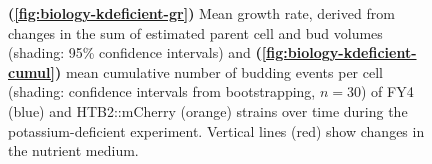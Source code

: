 \begin{figure}
  \caption[
    Mean growth rate, derived from changes in the sum of estimated parent cell and bud volumes and
    mean cumulative number of budding events per cell
    of FY4 and HTB2::mCherry strains over time during the potassium-deficient experiment.
  ]{
    \textbf{(\ref{fig:biology-kdeficient-gr})}
    Mean growth rate, derived from changes in the sum of estimated parent cell and bud volumes (shading: 95\% confidence intervals) and
    \textbf{(\ref{fig:biology-kdeficient-cumul})}
    mean cumulative number of budding events per cell (shading: confidence intervals from bootstrapping, $n=30$)
    of FY4 (blue) and HTB2::mCherry (orange) strains over time during the potassium-deficient experiment.
    Vertical lines (red) show changes in the nutrient medium.
  }
  \label{fig:biology-kdeficient-gr-budprob}
\end{figure}


